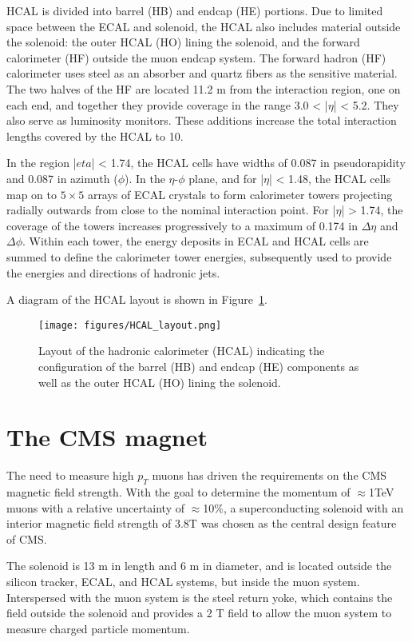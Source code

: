 HCAL is divided into barrel (HB) and endcap (HE) portions. Due to limited space between the ECAL and solenoid, the HCAL also includes material outside the solenoid: the outer HCAL (HO) lining the solenoid, and the forward calorimeter (HF) outside the muon endcap system. The forward hadron (HF) calorimeter uses steel as an absorber and quartz fibers as the sensitive material. The two halves of the HF are located 11.2 m from the interaction region, one on each end, and together they provide coverage in the range 3.0 < |$\eta$| < 5.2. They also serve as luminosity monitors. These additions increase the total interaction lengths covered by the HCAL to 10.\cite{TDR}

In the region |$eta$| < 1.74, the HCAL cells have widths of 0.087 in pseudorapidity and 0.087 in azimuth ($\phi$). In the $\eta$-$\phi$ plane, and for |$\eta$| < 1.48, the HCAL cells map on to $5 \times 5$ arrays of ECAL crystals to form calorimeter towers projecting radially outwards from close to the nominal interaction point. For |$\eta$| > 1.74, the coverage of the towers increases progressively to a maximum of 0.174 in $\Delta \eta$ and $\Delta \phi$. Within each tower, the energy deposits in ECAL and HCAL cells are summed to define the calorimeter tower energies, subsequently used to provide the energies and directions of hadronic jets.


A diagram of the HCAL layout is shown in Figure~\ref{fig:HCAL_layout}.

\begin{figure}\centering
  \texttt{[image: figures/HCAL\_layout.png]}
  \caption{\label{fig:HCAL_layout} Layout of the hadronic calorimeter (HCAL) indicating the configuration of the barrel (HB) and endcap (HE) components as well as the outer HCAL (HO) lining the solenoid.}
\end{figure}

\section{The CMS magnet}

The need to measure high $p_{T}$ muons has driven the requirements on the CMS magnetic field strength. With the goal to determine the momentum of $\approx$1TeV muons with a relative uncertainty of $\approx $10\%, a superconducting solenoid with an interior magnetic field strength of 3.8T was chosen as the central design feature of CMS.

The solenoid is 13 m in length and 6 m in diameter, and is located outside the silicon tracker, ECAL, and HCAL systems, but inside the muon system. Interspersed with the muon system is the steel return yoke, which contains the field outside the solenoid and provides a 2 T field to allow the muon system to measure charged particle momentum. 

